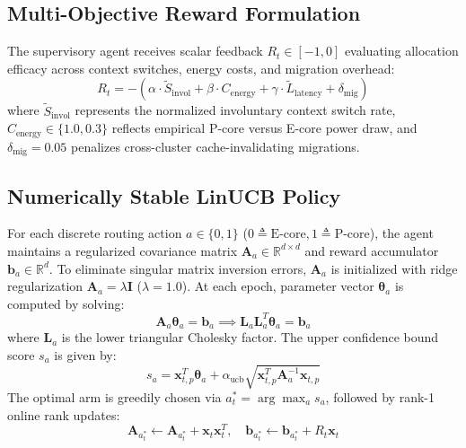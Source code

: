 \documentclass[conference]{IEEEtran}
\begin{document}
\subsection{Multi-Objective Reward Formulation}
The supervisory agent receives scalar feedback $R_t \in [-1, 0]$ evaluating allocation efficacy across context switches, energy costs, and migration overhead:
\begin{equation}
R_t = -\left(\alpha \cdot \widetilde{S}_{\text{invol}} + \beta \cdot C_{\text{energy}} + \gamma \cdot \widetilde{L}_{\text{latency}} + \delta_{\text{mig}}\right)
\end{equation}
where $\widetilde{S}_{\text{invol}}$ represents the normalized involuntary context switch rate, $C_{\text{energy}} \in \{1.0, 0.3\}$ reflects empirical P-core versus E-core power draw, and $\delta_{\text{mig}} = 0.05$ penalizes cross-cluster cache-invalidating migrations.

\subsection{Numerically Stable LinUCB Policy}
For each discrete routing action $a \in \{0, 1\}$ ($0 \triangleq \text{E-core}, 1 \triangleq \text{P-core}$), the agent maintains a regularized covariance matrix $\mathbf{A}_a \in \mathbb{R}^{d \times d}$ and reward accumulator $\mathbf{b}_a \in \mathbb{R}^d$.
To eliminate singular matrix inversion errors, $\mathbf{A}_a$ is initialized with ridge regularization $\mathbf{A}_a = \lambda \mathbf{I}$ ($\lambda = 1.0$). At each epoch, parameter vector $\boldsymbol{\theta}_a$ is computed by solving:
\begin{equation}
\mathbf{A}_a \boldsymbol{\theta}_a = \mathbf{b}_a \implies \mathbf{L}_a \mathbf{L}_a^T \boldsymbol{\theta}_a = \mathbf{b}_a
\end{equation}
where $\mathbf{L}_a$ is the lower triangular Cholesky factor. The upper confidence bound score $s_a$ is given by:
\begin{equation}
s_a = \mathbf{x}_{t,p}^T \boldsymbol{\theta}_a + \alpha_{\text{ucb}} \sqrt{\mathbf{x}_{t,p}^T \mathbf{A}_a^{-1} \mathbf{x}_{t,p}}
\end{equation}
The optimal arm is greedily chosen via $a_t^* = \arg\max_{a} s_a$, followed by rank-1 online rank updates:
\begin{equation}
\mathbf{A}_{a_t^*} \leftarrow \mathbf{A}_{a_t^*} + \mathbf{x}_t \mathbf{x}_t^T, \quad \mathbf{b}_{a_t^*} \leftarrow \mathbf{b}_{a_t^*} + R_t \mathbf{x}_t
\end{equation}
\end{document}
